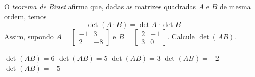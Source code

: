 O {\it teorema de Binet} afirma que, dadas as matrizes quadradas $A$ e $B$ de mesma ordem, temos
\[\det(A\cdot B)=\det A\cdot\det B\]
Assim, supondo $A = \left[\begin{array}{cc}
-1 & 3 \\
2 & -8
\end{array}\right]$ e $B = \left[\begin{array}{cc}
2 & -1 \\
3 & 0
\end{array}\right]$. Calcule $\det(AB)$.

$\det(AB)=6$
$\det(AB)=5$
$\det(AB)=3$
$\det(AB)=-2$
$\det(AB)=-5$


